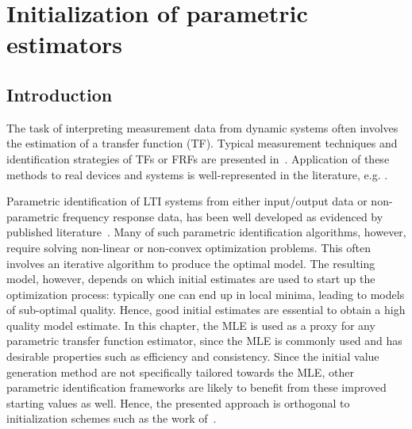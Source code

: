 \chapter{Initialization of parametric estimators}
\label{sec:initvals}
\gdef\thisDir{ch05-initvals}

\section{Introduction}
\label{sec:initial-values:introd}
The task of interpreting measurement data from dynamic systems often involves the estimation of a transfer function (TF). 
Typical measurement techniques and identification strategies of  \glspl{TF} or \glspl{FRF} are presented in~\citep{Schoukens1998,Schoukens2006LPM,Guillaume1996,Broersen1995,Pintelon2010LPM1,Antoni2007FRF}.
Application of these methods to real devices and systems is well-represented in the literature, e.g. \citep{Lim2010,Robinson1990,Behjat2010}.

Parametric identification of \gls{LTI} systems from either input/output data or non-parametric frequency response data, has been well developed as evidenced by published literature~\citep{Pintelon2012,Ljung1999,Schoukens1999,Pintelon1998}.
Many of such parametric identification algorithms, however, require solving non-linear or non-convex optimization problems.
This often involves an iterative algorithm to produce the optimal model.
 The resulting model, however, depends on which initial estimates are used to start up the optimization process: typically one can end up in local minima, leading to models of sub-optimal quality.
 Hence, good initial estimates are essential to obtain a high quality model estimate.
 In this chapter, the \gls{MLE} is used as a proxy for any parametric transfer function estimator, since the \gls{MLE} is commonly used and has desirable properties such as efficiency and consistency.
 Since the initial value generation method are not specifically tailored towards the \gls{MLE}, other parametric identification frameworks are likely to benefit from these improved starting values as well.
 Hence, the presented approach is orthogonal to initialization schemes such as the work of~\citet{vanHerpen2014}.

